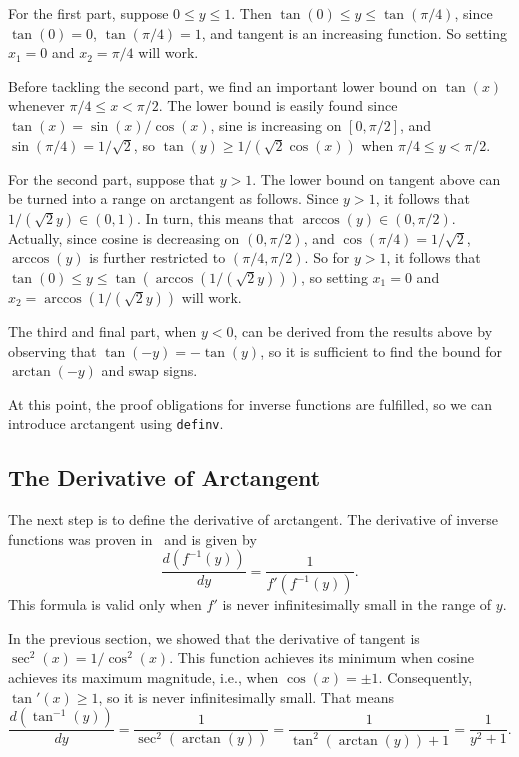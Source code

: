 \documentclass[copyright,creativecommons]{eptcs}
\begin{document}
For the first part, suppose $0 \le y \le 1$. Then $\tan(0) \le y \le
\tan(\pi/4)$, since $\tan(0) = 0$, $\tan(\pi/4) = 1$, and tangent is 
an increasing function. So setting $x_1=0$ and $x_2=\pi/4$ will work.

Before tackling the second part, we find an important lower bound on
$\tan(x)$ whenever $\pi/4 \le x < \pi/2$. The lower bound is easily 
found since $\tan(x) = \sin(x)/\cos(x)$, sine is increasing on $[0,
\pi/2]$, and $\sin(\pi/4) = 1/\sqrt{2}$, so $\tan(y) \ge
1/(\sqrt{2}\cos(x))$ when $\pi/4 \le y < \pi/2$.

For the second part, suppose that $y>1$.
The lower bound on tangent above can be turned into a range on arctangent as
follows.  Since $y > 1$, it follows that $1/(\sqrt{2}y) \in (0,
1)$. In turn, this means that $\arccos(y) \in (0, \pi/2)$.  Actually,
since cosine is decreasing on $(0, \pi/2)$, and
$\cos(\pi/4)=1/\sqrt{2}$, $\arccos(y)$ is further restricted to $(\pi/4,
\pi/2)$.  So for $y > 1$, it follows that 
$\tan(0) \le y \le \tan(\arccos(1/(\sqrt{2}y)))$, so setting
$x_1=0$ and $x_2=\arccos(1/(\sqrt{2}y))$ will work.

The third and final part, when $y < 0$, can be derived from the results
above by observing that $\tan(-y) = -\tan(y)$, so it is sufficient to
find the bound for $\arctan(-y)$ and swap signs.

At this point, the proof obligations for inverse functions are
fulfilled, so we can introduce arctangent using \texttt{definv}.

\subsection{The Derivative of Arctangent}

The next step is to define the derivative of arctangent. The
derivative of inverse functions was proven in~\cite{GaCo:chain-rule}
and is given by 
\begin{equation}
\frac{d(f^{-1}(y))}{dy} = \frac{1}{f'(f^{-1}(y))}.
\end{equation}
This formula is valid only when $f'$ is never infinitesimally small in
the range of $y$.

In the previous section, we showed that the derivative of tangent is
$\sec^2(x) = 1/\cos^2(x)$.  This function achieves its minimum when
cosine achieves its maximum magnitude, i.e., when $\cos(x) = \pm
1$. Consequently, $\tan'(x) \ge 1$, so it is never infinitesimally
small. That means
\begin{equation}
\frac{d(\tan^{-1}(y))}{dy} = \frac{1}{\sec^2(\arctan(y))} =
\frac{1}{\tan^2(\arctan(y)) + 1} = \frac{1}{y^2+1}.
\end{equation}
\end{document}
